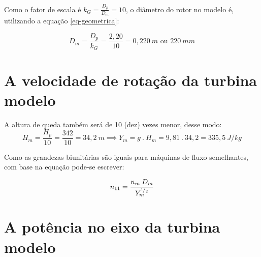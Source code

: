     Como o fator de escala é $k_G = \frac{D_p}{D_m} = 10$, o diâmetro do rotor no modelo é, utilizando a equação \eqref{eq-geometrica}:

    \begin{equation*}
        D_m = \frac{D_p}{k_G} = \frac{2,20}{10} = 0,220\:m \mbox{ ou } 220\: mm
    \end{equation*}

\section{A velocidade de rotação da turbina modelo}

    A altura de queda também será de 10 (dez) vezes menor, desse modo:
    \begin{equation*}
        H_m = \frac{H_p}{10} = \frac{342}{10} = 34,2\:m \implies Y_m = g \: . \: H_m = 9,81 \: . \: 34,2 = 335,5\: J/kg
    \end{equation*}

    Como as grandezas biunitárias são iguais para máquinas de fluxo semelhantes, com base na equação pode-se escrever:

    \begin{equation}
        n_{11} = \frac{n_m \: D_m}{Y_m^{{}^{1}\!/_{2}}}
    \end{equation}

\section{A potência no eixo da turbina modelo}
